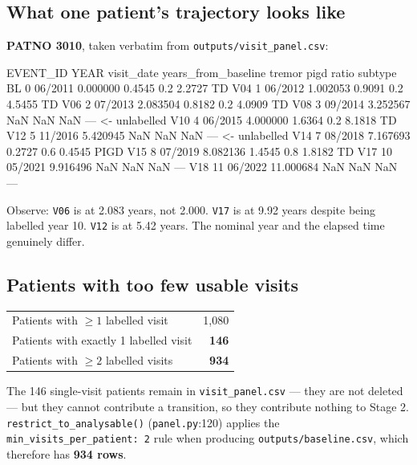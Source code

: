 \documentclass[11pt,a4paper]{article}
\newcommand{\code}[1]{\texttt{\small #1}}
\begin{document}
\subsection{What one patient's trajectory looks like}

\textbf{PATNO 3010}, taken verbatim from \code{outputs/visit\_panel.csv}:

\begin{codeblock}
EVENT_ID  YEAR visit_date  years_from_baseline  tremor  pigd    ratio  subtype
      BL     0    06/2011             0.000000  0.4545   0.2   2.2727       TD
     V04     1    06/2012             1.002053  0.9091   0.2   4.5455       TD
     V06     2    07/2013             2.083504  0.8182   0.2   4.0909       TD
     V08     3    09/2014             3.252567     NaN   NaN      NaN      ---   <- unlabelled
     V10     4    06/2015             4.000000  1.6364   0.2   8.1818       TD
     V12     5    11/2016             5.420945     NaN   NaN      NaN      ---   <- unlabelled
     V14     7    08/2018             7.167693  0.2727   0.6   0.4545     PIGD
     V15     8    07/2019             8.082136  1.4545   0.8   1.8182       TD
     V17    10    05/2021             9.916496     NaN   NaN      NaN      ---
     V18    11    06/2022            11.000684     NaN   NaN      NaN      ---
\end{codeblock}

\noindent
Observe: \code{V06} is at 2.083 years, not 2.000. \code{V17} is at 9.92 years
despite being labelled year 10. \code{V12} is at 5.42 years. The nominal year
and the elapsed time genuinely differ.

\subsection{Patients with too few usable visits}

\begin{table}[h]
\centering
\begin{tabular}{@{}lr@{}}
\toprule
Patients with $\geq 1$ labelled visit        & 1{,}080 \\
Patients with exactly 1 labelled visit       & \textbf{146} \\
Patients with $\geq 2$ labelled visits       & \textbf{934} \\
\bottomrule
\end{tabular}
\end{table}

\noindent
The 146 single-visit patients remain in \code{visit\_panel.csv} --- they are not
deleted --- but they cannot contribute a transition, so they contribute nothing
to Stage 2. \code{restrict\_to\_analysable()} (\code{panel.py}:120) applies the
\code{min\_visits\_per\_patient: 2} rule when producing
\code{outputs/baseline.csv}, which therefore has \textbf{934 rows}.
\end{document}
